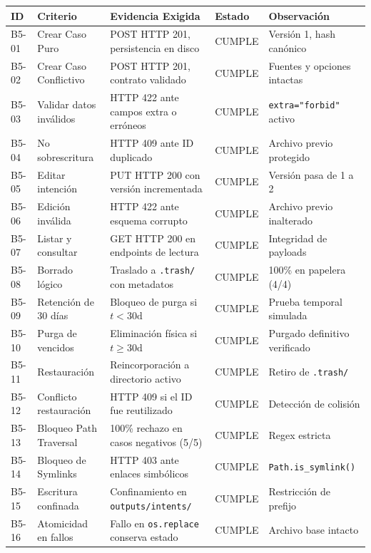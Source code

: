 \documentclass[11pt,a4paper]{article}
\begin{document}
\begin{table}[H]
\centering
\small
\begin{tabularx}{\textwidth}{p{1.1cm}p{3.3cm}Xp{1.5cm}p{3.2cm}}
\toprule
\textbf{ID} & \textbf{Criterio} & \textbf{Evidencia Exigida} & \textbf{Estado} & \textbf{Observación} \\
\midrule
B5-01 & Crear Caso Puro & POST HTTP 201, persistencia en disco & CUMPLE & Versión 1, hash canónico \\
B5-02 & Crear Caso Conflictivo & POST HTTP 201, contrato validado & CUMPLE & Fuentes y opciones intactas \\
B5-03 & Validar datos inválidos & HTTP 422 ante campos extra o erróneos & CUMPLE & \texttt{extra="forbid"} activo \\
B5-04 & No sobrescritura & HTTP 409 ante ID duplicado & CUMPLE & Archivo previo protegido \\
B5-05 & Editar intención & PUT HTTP 200 con versión incrementada & CUMPLE & Versión pasa de 1 a 2 \\
B5-06 & Edición inválida & HTTP 422 ante esquema corrupto & CUMPLE & Archivo previo inalterado \\
B5-07 & Listar y consultar & GET HTTP 200 en endpoints de lectura & CUMPLE & Integridad de payloads \\
B5-08 & Borrado lógico & Traslado a \texttt{.trash/} con metadatos & CUMPLE & 100\% en papelera (4/4) \\
B5-09 & Retención de 30 días & Bloqueo de purga si $t < 30\text{d}$ & CUMPLE & Prueba temporal simulada \\
B5-10 & Purga de vencidos & Eliminación física si $t \ge 30\text{d}$ & CUMPLE & Purgado definitivo verificado \\
B5-11 & Restauración & Reincorporación a directorio activo & CUMPLE & Retiro de \texttt{.trash/} \\
B5-12 & Conflicto restauración & HTTP 409 si el ID fue reutilizado & CUMPLE & Detección de colisión \\
B5-13 & Bloqueo Path Traversal & 100\% rechazo en casos negativos (5/5) & CUMPLE & Regex estricta \\
B5-14 & Bloqueo de Symlinks & HTTP 403 ante enlaces simbólicos & CUMPLE & \texttt{Path.is\_symlink()} \\
B5-15 & Escritura confinada & Confinamiento en \texttt{outputs/intents/} & CUMPLE & Restricción de prefijo \\
B5-16 & Atomicidad en fallos & Fallo en \texttt{os.replace} conserva estado & CUMPLE & Archivo base intacto \\

\end{tabularx}
\end{table}
\end{document}
